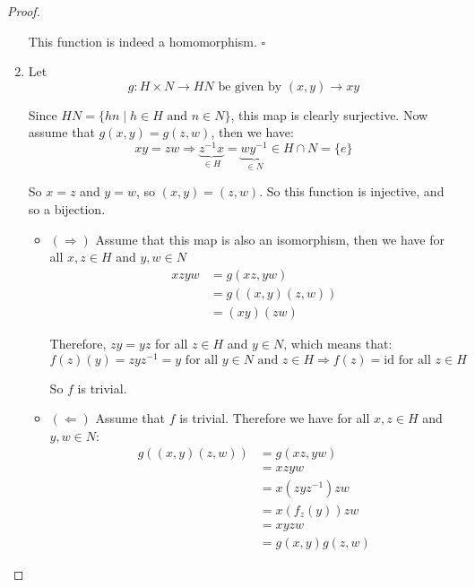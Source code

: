 \begin{exercise}
\begin{proof}
\begin{enumerate}[label = (\alph*)]
                This function is indeed a homomorphism.
                \newline $\square$
                \item Let \[g\colon H\times N\rightarrow HN \text{ be given by }(x,y) \rightarrow xy\]
                
                Since $HN = \{hn\mid h\in H\text{ and }n\in N\}$, this map is clearly surjective. Now assume that $g(x,y) = g(z,w)$, then we have:\begin{equation*}
                    xy=zw \Rightarrow \underbrace{z^{-1}x}_{\in H} = \underbrace{wy^{-1}}_{\in N}\in H \cap N = \{e\}
                \end{equation*}

                So $x=z$ and $y=w$, so $(x,y)=(z,w)$. So this function is injective, and so a bijection.

                \begin{itemize}
                    \item $(\Rightarrow)$ Assume that this map is also an isomorphism, then we have for all $x,z\in H$ and $y,w\in N$ \begin{align*}
                        xzyw &= g(xz,yw)\\
                            &= g((x,y)(z,w))\\
                            &= (xy)(zw)
                    \end{align*}
    
                    Therefore, $zy = yz$ for all $z\in H$ and $y\in N$, which means that:\begin{equation*}
                        f(z)(y) = zyz^{-1} = y \text{ for all }y\in N\text{ and }z\in H \Rightarrow f(z) = \text{id} \text{ for all }z\in H
                    \end{equation*}
    
                    So $f$ is trivial.
                    \item $(\Leftarrow)$ Assume that $f$ is trivial. Therefore we have for all $x,z\in H$ and $y,w\in N$:\begin{align*}
                        g((x,y)(z,w)) &= g(xz,yw)\\
                        &= xzyw\\
                        &= x(zyz^{-1})zw\\
                        &= x(f_z(y))zw\\
                        &= xyzw\\
                        &= g(x,y)g(z,w)
                    \end{align*}


\end{itemize}
\end{enumerate}
\end{proof}
\end{exercise}
